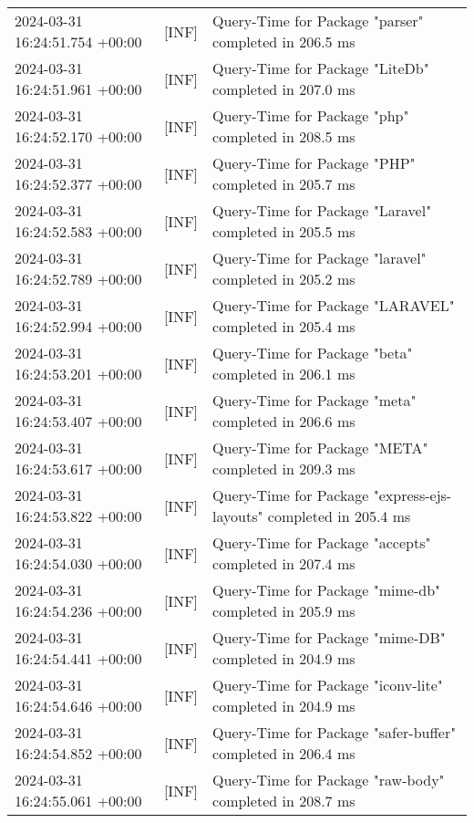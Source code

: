 {{\begin{tabularx}{\textwidth}{|l|l|X|}
                    2024-03-31 16:24:51.754 +00:00 & [INF] & Query-Time for Package "parser" completed in 206.5 ms \\
                    2024-03-31 16:24:51.961 +00:00 & [INF] & Query-Time for Package "LiteDb" completed in 207.0 ms \\
                    2024-03-31 16:24:52.170 +00:00 & [INF] & Query-Time for Package "php" completed in 208.5 ms \\
                    2024-03-31 16:24:52.377 +00:00 & [INF] & Query-Time for Package "PHP" completed in 205.7 ms \\
                    2024-03-31 16:24:52.583 +00:00 & [INF] & Query-Time for Package "Laravel" completed in 205.5 ms \\
                    2024-03-31 16:24:52.789 +00:00 & [INF] & Query-Time for Package "laravel" completed in 205.2 ms \\
                    2024-03-31 16:24:52.994 +00:00 & [INF] & Query-Time for Package "LARAVEL" completed in 205.4 ms \\
                    2024-03-31 16:24:53.201 +00:00 & [INF] & Query-Time for Package "beta" completed in 206.1 ms \\
                    2024-03-31 16:24:53.407 +00:00 & [INF] & Query-Time for Package "meta" completed in 206.6 ms \\
                    2024-03-31 16:24:53.617 +00:00 & [INF] & Query-Time for Package "META" completed in 209.3 ms \\
                    2024-03-31 16:24:53.822 +00:00 & [INF] & Query-Time for Package "express-ejs-layouts" completed in 205.4 ms \\
                    2024-03-31 16:24:54.030 +00:00 & [INF] & Query-Time for Package "accepts" completed in 207.4 ms \\
                    2024-03-31 16:24:54.236 +00:00 & [INF] & Query-Time for Package "mime-db" completed in 205.9 ms \\
                    2024-03-31 16:24:54.441 +00:00 & [INF] & Query-Time for Package "mime-DB" completed in 204.9 ms \\
                    2024-03-31 16:24:54.646 +00:00 & [INF] & Query-Time for Package "iconv-lite" completed in 204.9 ms \\
                    2024-03-31 16:24:54.852 +00:00 & [INF] & Query-Time for Package "safer-buffer" completed in 206.4 ms \\
                    2024-03-31 16:24:55.061 +00:00 & [INF] & Query-Time for Package "raw-body" completed in 208.7 ms \\

\end{tabularx}}}
